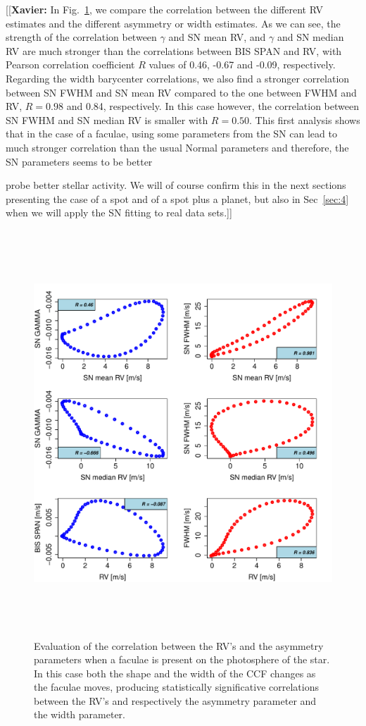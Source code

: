 \documentclass[11pt, oneside]{article}
\newcommand{\xavier}[1]{{\color{blue}[[\textbf{Xavier: }#1]]}}
\begin{document}
\xavier{In Fig.~\ref{fig:faculae.corr}, we compare the correlation between the different RV estimates and the different asymmetry or width estimates. As we can see, the strength of the correlation between $\gamma$ and SN mean RV, and $\gamma$ and SN median RV are much stronger than the correlations between BIS SPAN and RV, with Pearson correlation coefficient $R$ values of 0.46, -0.67 and -0.09, respectively. Regarding the width barycenter correlations, we also find a stronger correlation between SN FWHM and SN mean RV compared to the one between FWHM and RV, $R=0.98$ and 0.84, respectively. In this case however, the correlation between SN FWHM and SN median RV is smaller with $R=0.50$. This first analysis shows that in the case of a faculae, using some parameters from the SN can lead to much stronger correlation than the usual Normal parameters and therefore, the SN parameters seems to be better 

probe better stellar activity. We will of course confirm this in the next sections presenting the case of a spot and of a spot plus a planet, but also in Sec~\ref{sec:4} when we will apply the SN fitting to real data sets.}

\begin{figure}[htbp]
   \centering
\includegraphics[height = 6in]{SOAP_FACULAE_Comparison_para_SN.pdf} 
   \caption{Evaluation of the correlation between the RV's and the asymmetry parameters when a faculae is present on the photosphere of the star. In this case both the shape and the width of the CCF changes as the faculae moves, producing statistically significative correlations between the RV's and respectively the asymmetry parameter and the width parameter.}
    \label{fig:faculae.corr}
\end{figure}
\end{document}
